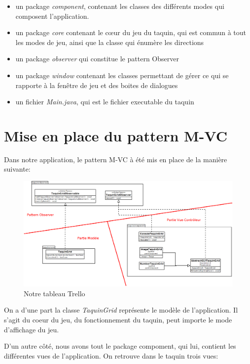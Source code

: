 		\begin{itemize}
			\item un package \textit{component}, contenant les classes des différents modes qui composent l’application.
			\item un package  \textit{core} contenant le cœur du jeu du taquin, qui est commun à tout les modes de jeu, ainsi que la classe qui énumère les directions
			\item un package \textit{observer} qui constitue le pattern Observer
			\item un package \textit{window} contenant les classes permettant de gérer ce qui se rapporte à la fenêtre de jeu et des boites de dialogues
			\item un fichier \textit{Main.java}, qui est le fichier executable du taquin
		\end{itemize}

	\section{Mise en place du pattern M-VC}

	Dans notre application, le pattern M-VC à été mis en place de la manière suivante:

	\begin{figure}[H]
		\centering\includegraphics[width=1\textwidth, keepaspectratio]{img/diagramMVC.png}
		\caption{Notre tableau Trello}
		\label{Mise en place du M-VC}
	\end{figure}

	On a d'une part la classe \textit{TaquinGrid} représente le modèle de l'application. Il s'agit du coeur du jeu, du fonctionnement du taquin, peut importe le mode d'affichage du jeu.

	D'un autre côté, nous avons tout le package compoment, qui lui, contient les différentes vues de l'application. On retrouve dans le taquin trois vues:

